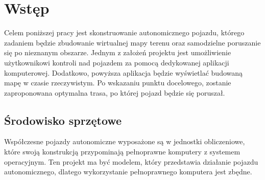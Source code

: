 \section{Wstęp}
    Celem poniższej pracy jest skonstruowanie autonomicznego pojazdu,
    którego zadaniem będzie zbudowanie wirtualnej mapy terenu oraz samodzielne poruszanie się po nieznanym obszarze.
    Jednym z założeń projektu jest umożliwienie użytkownikowi kontroli nad pojazdem za pomocą dedykowanej aplikacji komputerowej.
    Dodatkowo, powyższa aplikacja będzie wyświetlać budowaną mapę w czasie rzeczywistym.
    Po wskazaniu punktu docelowego, zostanie zaproponowana optymalna trasa, po której pojazd będzie się poruszał.


    \subsection{Środowisko sprzętowe}
        Współczesne pojazdy autonomiczne wyposażone są w jednostki obliczeniowe, które swoją konstrukcją przypominają pełnoprawne komputery z systemem operacyjnym.
        Ten projekt ma być modelem, który przedstawia działanie pojazdu autonomicznego, dlatego wykorzystanie pełnoprawnego komputera jest zbędne.

